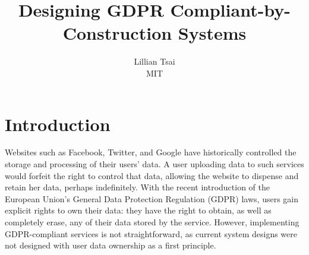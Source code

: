 \documentclass[letterpaper,twocolumn,10pt]{article}
\begin{document}

\date{}

\title{\Large \bf Designing GDPR Compliant-by-Construction Systems}

\author{
{\rm Lillian Tsai}\\
MIT
} %

\maketitle

\section{Introduction}
Websites such as Facebook, Twitter, and Google have historically controlled the storage and processing of their users' data.
A user uploading data to such services would forfeit the right to control that data, allowing the website to dispense and retain her data, perhaps indefinitely.
With the recent introduction of the European Union's General Data Protection Regulation (GDPR) laws, 
users gain explicit rights to own their data: they have the right to obtain, as well as completely erase, 
any of their data stored by the service. 
However, implementing GDPR-compliant services is not straightforward, 
as current system designs were not designed with user data ownership as a first principle.
\end{document}

